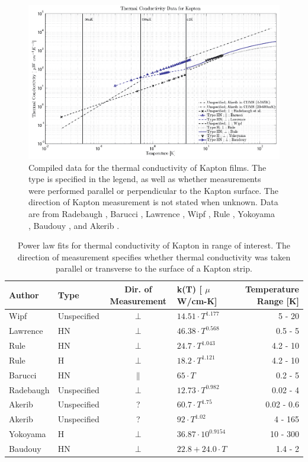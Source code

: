\documentclass{report}
\begin{document}
\begin{figure}[h]
\includegraphics[width = .9\textwidth]{Kapton_var.png}
\caption{Compiled data for the thermal conductivity of Kapton films. The type is specified in the legend, as well as whether measurements were performed parallel or perpendicular to the Kapton surface. The direction of Kapton measurement is not stated when unknown. Data are from Radebaugh \cite{rad73}, Barucci \cite{bar}, Lawrence \cite{law}, Wipf \cite{wip}, Rule \cite{Rule1996}, Yokoyama \cite{yok}, Baudouy \cite{Baudouy2003}, and Akerib \cite{Akerib}. }
\end{figure}

\begin{table}[h]
\centering
\begin{threeparttable}
\begin{tabular}{llclr}
\toprule
Author & Type & Dir. of Measurement & k(T) [ $\mu$W/cm-K] & Temperature Range [K]\\
\midrule
Wipf \cite{wip} & Unspecified & $\perp$ & $14.51 \cdot T^{1.177}$ & 5 - 20 \\
Lawrence \cite{law} & HN & $\perp$ & $46.38 \cdot T^{0.568}$ & 0.5 - 5 \\
Rule \cite{Rule1996} & HN & $\perp$ & $24.7 \cdot T^{1.043}$ & 4.2 - 10 \\
Rule \cite{Rule1996} & H & $\perp$ & $18.2 \cdot T^{1.121}$ & 4.2 - 10 \\
Barucci \cite{bar} & HN & $\parallel$ & $65 \cdot T$ & 0.2 - 5 \\
Radebaugh \cite{rad73} & Unspecified & $\perp$ & $12.73 \cdot T^{0.982}$ & 0.02 - 4 \\
Akerib \cite{Akerib} & Unspecified & ? & $60.7 \cdot T^{1.75}$ & 0.02 - 0.6  \\
Akerib \cite{Akerib}& Unspecified & ? & $92 \cdot T^{1.02}$ & 4 - 165 \\
Yokoyama \cite{yok} & H & $\perp$ & $36.87 \cdot 10^{0.9154}$ & 10 - 300 \\
Baudouy \cite{Baudouy2003} & HN & $\perp$ & $22.8 + 24.0 \cdot T$ & 1.4 - 2 \\
\bottomrule
\end{tabular}
\caption{Power law fits for thermal conductivity of Kapton in range of interest. The direction of measurement specifies whether thermal conductivity was taken parallel or transverse to the surface of a Kapton strip.}
\end{threeparttable}
\end{table}
\end{document}
